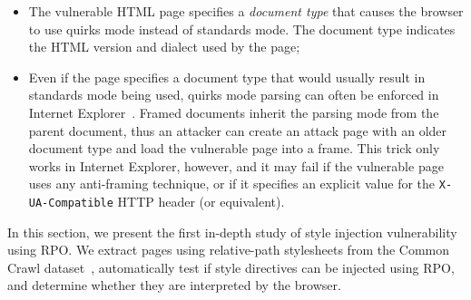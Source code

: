 \begin{itemize}

\item The vulnerable HTML page specifies a \textit{document type} that causes
the browser to use quirks mode instead of standards mode. The document type
indicates the HTML version and dialect used by the page;

\item Even if the page specifies a document type that would usually result in
standards mode being used, quirks mode parsing can often be enforced in Internet
Explorer~\cite{prssi}. Framed documents inherit the parsing mode from the parent
document, thus an attacker can create an attack page with an older document type
and load the vulnerable page into a frame. This trick only works in Internet
Explorer, however, and it may fail if the vulnerable page uses any anti-framing
technique, or if it specifies an explicit value for the \texttt{X-UA-Compatible}
HTTP header (or equivalent).

\end{itemize}

In this section, we present the first in-depth study of style injection
vulnerability using RPO. We extract pages using relative-path stylesheets from
the Common Crawl dataset~\cite{common_crawl}, automatically test if style
directives can be injected using RPO, and determine whether they are interpreted
by the browser.
